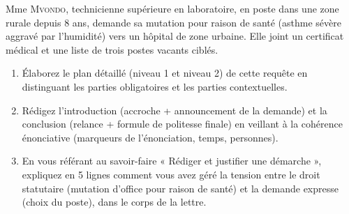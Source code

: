 \documentclass[11pt]{article}
\begin{document}
\begin{exercice}
Mme \textsc{Mvondo}, technicienne supérieure en laboratoire, en poste dans une zone rurale depuis 8 ans, demande sa mutation pour raison de santé (asthme sévère aggravé par l'humidité) vers un hôpital de zone urbaine. Elle joint un certificat médical et une liste de trois postes vacants ciblés.
\begin{enumerate}
    \item Élaborez le plan détaillé (niveau 1 et niveau 2) de cette requête en distinguant les parties obligatoires et les parties contextuelles.
    \item Rédigez l'introduction (accroche + announcement de la demande) et la conclusion (relance + formule de politesse finale) en veillant à la cohérence énonciative (marqueurs de l'énonciation, temps, personnes).
    \item En vous référant au savoir-faire « Rédiger et justifier une démarche », expliquez en 5 lignes comment vous avez géré la tension entre le droit statutaire (mutation d'office pour raison de santé) et la demande expresse (choix du poste), dans le corps de la lettre.
\end{enumerate}
\end{exercice}
\end{document}
